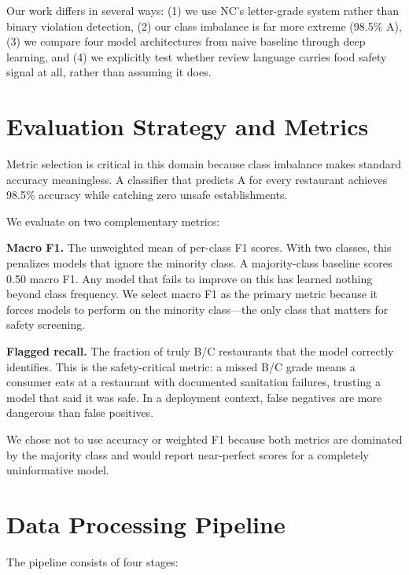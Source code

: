 \documentclass{article}
\begin{document}
Our work differs in several ways: (1) we use NC's letter-grade system rather than binary violation detection, (2) our class imbalance is far more extreme (98.5\% A), (3) we compare four model architectures from naive baseline through deep learning, and (4) we explicitly test whether review language carries food safety signal at all, rather than assuming it does.

\section{Evaluation Strategy and Metrics}

Metric selection is critical in this domain because class imbalance makes standard accuracy meaningless. A classifier that predicts A for every restaurant achieves 98.5\% accuracy while catching zero unsafe establishments.

We evaluate on two complementary metrics:

\textbf{Macro F1.} The unweighted mean of per-class F1 scores. With two classes, this penalizes models that ignore the minority class. A majority-class baseline scores 0.50 macro F1. Any model that fails to improve on this has learned nothing beyond class frequency. We select macro F1 as the primary metric because it forces models to perform on the minority class---the only class that matters for safety screening.

\textbf{Flagged recall.} The fraction of truly B/C restaurants that the model correctly identifies. This is the safety-critical metric: a missed B/C grade means a consumer eats at a restaurant with documented sanitation failures, trusting a model that said it was safe. In a deployment context, false negatives are more dangerous than false positives.

We chose not to use accuracy or weighted F1 because both metrics are dominated by the majority class and would report near-perfect scores for a completely uninformative model.

\section{Data Processing Pipeline}

The pipeline consists of four stages:
\end{document}
